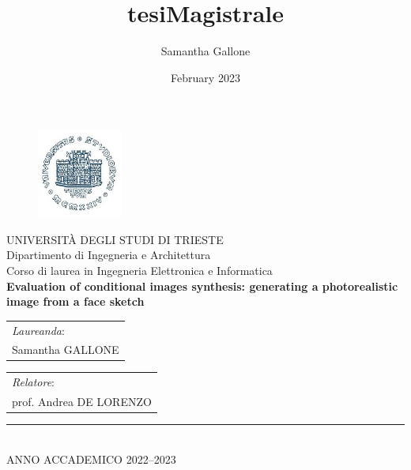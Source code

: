 \documentclass[paper=a4, fontsize=14pt, titlepage, oneside]{article}
\title{tesiMagistrale}
\author{Samantha Gallone}
\date{February 2023}
\begin{document}
\thispagestyle{empty}
\setcounter{page}{0}

 \begin{figure}[htbp]
	\centering
	\includegraphics[width=%
	 0.25\textwidth]{figures/unitsLogo.jpg}
	\end{figure}
\begin{center}

\Large

UNIVERSIT\`A DEGLI STUDI DI TRIESTE\\
Dipartimento di Ingegneria e Architettura\\
\bigskip
Corso di laurea in Ingegneria Elettronica e Informatica \\
\vfill %
\LARGE{\textbf{Evaluation of conditional images synthesis: generating a photorealistic image from a face sketch}}\\
\vfill %
{}
\end{center}
\vfill
%
\begin{tabular}[t]{l}
\textit{Laureanda}:\\
Samantha GALLONE
\end{tabular}
\hfill 
%
\begin{tabular}[t]{l}
\textit{Relatore}: \\
prof. Andrea DE LORENZO
\end{tabular}
\vfill
\begin{center}
\normalsize
\rule{8cm}{0.1mm}\\
\bigskip
ANNO ACCADEMICO 2022--2023
\end{center}
\end{document}
